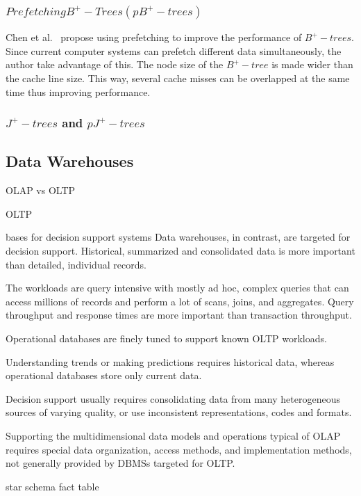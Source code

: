 \documentclass[12pt,a4paper]{article}
\begin{document}
\subsubsection*{$Prefetching B^{+}-Trees (pB^{+}-trees)$}

Chen et al.~\cite{chen2001improving} propose using prefetching to improve the performance of $B^{+}-trees$. Since current computer systems can prefetch different data simultaneously, the author take advantage of this. The node size of the $B^{+}-tree$ is made wider than the cache line size. This way, several cache misses can be overlapped at the same time thus improving performance.

\subsubsection*{$J^{+}-trees$ and $pJ^{+}-trees$}


\subsection{Data Warehouses}
\label{SEC-WAREHOUSES}

OLAP vs OLTP 

OLTP \cite{sen2005comparison}

bases for decision support systems \cite{248616}
Data warehouses, in contrast, are targeted for decision support. Historical, summarized and consolidated data is more important than detailed, individual records.

The workloads are query intensive with mostly ad hoc, complex queries that can access millions of records and perform a lot of scans, joins, and aggregates. Query throughput and response times are more important than transaction throughput.

Operational databases are finely tuned to support known OLTP workloads.

Understanding trends or making predictions requires historical data, whereas operational databases store only current data.

Decision support usually requires consolidating data from many heterogeneous sources of varying quality, or use inconsistent representations, codes and formats.

Supporting the multidimensional data models and operations typical of OLAP requires special data organization, access methods, and implementation methods, not generally provided by DBMSs targeted for OLTP.


star schema
fact table
\end{document}
